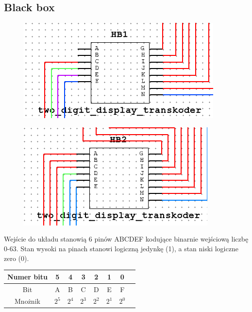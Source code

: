 \documentclass[a4paper]{article}
\begin{document}
\subsection{Black box}
\begin{figure}[H]
  \centering
  \includegraphics[width=\textwidth]{black_box2.png}
\end{figure}
\begin{figure}[H]
  \centering
  \includegraphics[width=\textwidth]{black_box3.png}
\end{figure}

Wejście do układu stanowią 6 pinów ABCDEF kodujące binarnie wejściową liczbę 0-63. Stan wysoki na pinach
stanowi logiczną jedynkę (1), a stan niski logiczne zero (0).
\begin{center}
  \begin{tabular}{|c|c|c|c|c|c|c|c|}
    \hline Numer bitu & 5 & 4 & 3 & 2 & 1 & 0 \\ 
    \hline Bit & A & B & C & D & E & F  \\
    \hline Mnożnik &$2^5$ &$2^4$ & $2^3$ & $2^2$ & $2^1$ & $2^0$  \\
    \hline
  \end{tabular}
\end{center}
\end{document}
